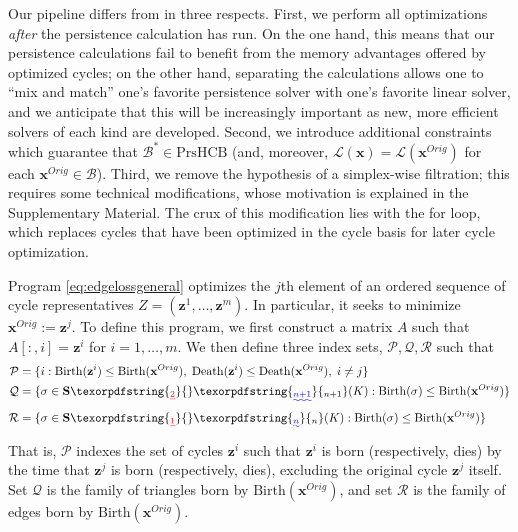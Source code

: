 \documentclass[utf8]{formatting_stuff/frontiersFPHY}
\newcommand{\Simplices}[0]{\mathbf{S}}
\newcommand{\originalrep}{\mathbf{x}^{Orig}}
\newcommand{\optimalrep}{\mathbf{x}}
\newcommand{\cycle}{{\mathbf z}}
\newcommand{\birth}{\mathrm{Birth}}
\newcommand{\death}{\mathrm{Death}}
\newcommand{\persinterval}{\mathcal{L}}
\newcommand{\setofpersistenthcyclebases}{\mathrm{PrsHCB}}
\newcommand{\hcyclebasis}{\mathcal B}
\newcommand{\goodcycleindices}{\mathcal P}
\newcommand{\goodtriangles}{\mathcal Q}
\newcommand{\goodedges}{\mathcal R}
\newcommand{\obasis}{Z}
\newcommand{\obasisel}{\mathbf{z}}
\theoremstyle{plain}
\theoremstyle{definition}
\providecommand{\DIFaddtex}[1]{{\protect\color{blue}\uwave{#1}}}
\providecommand{\DIFdeltex}[1]{{\protect\color{red}\sout{#1}}}
\providecommand{\DIFaddbegin}{} %
\providecommand{\DIFaddend}{} %
\providecommand{\DIFdelbegin}{} %
\providecommand{\DIFdelend}{} %
\providecommand{\DIFadd}[1]{\texorpdfstring{\DIFaddtex{#1}}{#1}} %
\providecommand{\DIFdel}[1]{\texorpdfstring{\DIFdeltex{#1}}{}} %
\begin{document}
Our pipeline differs from \cite{Escolar2016} in three respects.  First, we perform all optimizations \emph{after} the persistence calculation has run.   On the one hand, this means that our persistence calculations  fail to  benefit from the memory advantages offered by optimized cycles; on the other hand, separating the calculations allows one to ``mix and match'' one's favorite persistence solver with one's favorite linear solver, and we anticipate that this will be increasingly important as new, more efficient solvers of each kind are developed.  Second, we introduce additional constraints which guarantee that $\hcyclebasis^* \in \setofpersistenthcyclebases$  
(and, moreover, $\persinterval( \optimalrep) = \persinterval( \originalrep)$ for each $\originalrep \in \hcyclebasis$). Third, we remove the hypothesis of a simplex-wise filtration; this requires some technical modifications, whose motivation is explained in the Supplementary Material. The crux of this modification lies with the for loop, which replaces cycles that have been optimized in the cycle basis for later cycle optimization.

Program \eqref{eq:edgelossgeneral} optimizes the $j$th element of an ordered sequence of cycle representatives $\obasis = (\obasisel^1, \ldots, \obasisel^m)$.  In particular, it seeks to minimize $\originalrep := \cycle^j$.  To define this program, we first construct a matrix $A$ such that $A[:, i] = \cycle^i$ for $i = 1, \ldots, m$.  We then define  three index sets, $\goodcycleindices, \goodtriangles, \goodedges$ such that 
    \begin{align*}
        \goodcycleindices &= \{ i :  \birth(\cycle^i) \le \birth(\originalrep), \;  \death(\cycle^i) \le \death(\originalrep), \; i \neq j \} \\
        \goodtriangles &= \{\sigma \in \Simplices\DIFdelbegin \DIFdel{_2}\DIFdelend \DIFaddbegin \DIFadd{_{n+1}}\DIFaddend (K) : \birth(\sigma) \le \birth(\originalrep)\} 
        \\
        \goodedges &= \{\sigma \in \Simplices\DIFdelbegin \DIFdel{_1}\DIFdelend \DIFaddbegin \DIFadd{_n}\DIFaddend (K) : \birth(\sigma) \le \birth(\originalrep)\}
    \end{align*} 
That is, $\goodcycleindices$ indexes the set of cycles $\cycle^i$ such that $\cycle^i$ is born  (respectively, dies) by the time that $\cycle^j$ is born (respectively, dies),  excluding the original cycle $\cycle^j$ itself. Set $\goodtriangles$ is the family of triangles born by $\birth(\originalrep)$, and set $\goodedges$ is the family of edges born by $\birth(\originalrep)$. 
\end{document}
